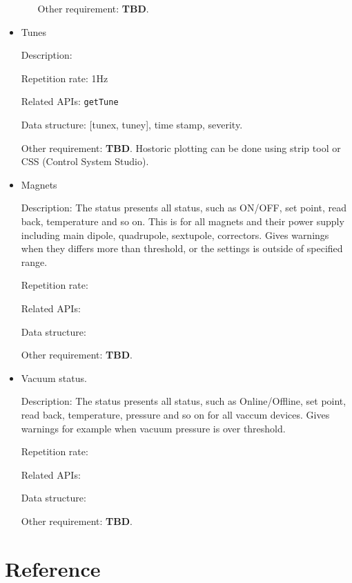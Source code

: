 \documentclass[letterpaper,showtrims]{memoir}
\newcommand{\code}[1]{\texttt{#1}}
\newcommand{\strong}[1]{{\bfseries #1}}
\begin{document}
\begin{itemize}
\begin{enumerate}
        Other requirement: \strong{TBD}. 

    \end{enumerate}

    \item Tunes

        Description: 
        
        Repetition rate: 1Hz
        
        Related APIs: \code{getTune}
        
        Data structure: [tunex, tuney], time stamp, severity.

        Other requirement: \strong{TBD}. Hostoric plotting can be done using
        strip tool or CSS (Control System Studio).

    \item Magnets

    Description: The status presents all status, such as ON/OFF, set
                 point, read back, temperature and so on. This is for
                 all magnets and their power supply including main
                 dipole, quadrupole, sextupole, correctors. Gives
                 warnings when they differs more than threshold, or the
                 settings is outside of specified range.

    Repetition rate: 
        
    Related APIs: 
  
    Data structure: 

    Other requirement: \strong{TBD}. 

    \item Vacuum status.

    Description: The status presents all status, such as Online/Offline, set
                 point, read back, temperature, pressure and so on for
                 all vaccum devices. Gives warnings for example when
                 vacuum pressure is over threshold. 

    Repetition rate: 
        
    Related APIs: 
  
    Data structure: 

    Other requirement: \strong{TBD}. 

\end{itemize}


\appendix
\chapter{Reference}
\end{document}
